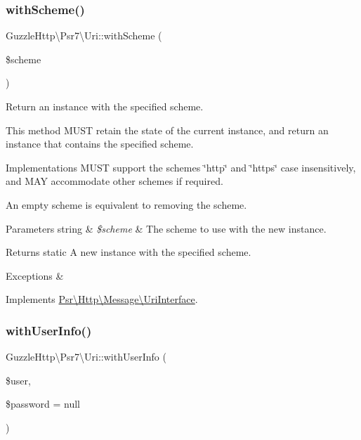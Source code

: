 \subsubsection{\texorpdfstring{with\+Scheme()}{withScheme()}}
{\footnotesize\ttfamily Guzzle\+Http\textbackslash{}\+Psr7\textbackslash{}\+Uri\+::with\+Scheme (\begin{DoxyParamCaption}\item[{}]{\$scheme }\end{DoxyParamCaption})}

Return an instance with the specified scheme.

This method M\+U\+ST retain the state of the current instance, and return an instance that contains the specified scheme.

Implementations M\+U\+ST support the schemes \char`\"{}http\char`\"{} and \char`\"{}https\char`\"{} case insensitively, and M\+AY accommodate other schemes if required.

An empty scheme is equivalent to removing the scheme.


\begin{DoxyParams}[1]{Parameters}
string & {\em \$scheme} & The scheme to use with the new instance. \\
\hline
\end{DoxyParams}
\begin{DoxyReturn}{Returns}
static A new instance with the specified scheme. 
\end{DoxyReturn}

\begin{DoxyExceptions}{Exceptions}
{\em } & \\
\hline
\end{DoxyExceptions}


Implements \hyperlink{interfacePsr_1_1Http_1_1Message_1_1UriInterface_af1eb8a046537a32fe08bc90f6debb9c6}{Psr\textbackslash{}\+Http\textbackslash{}\+Message\textbackslash{}\+Uri\+Interface}.

\mbox{\label{classGuzzleHttp_1_1Psr7_1_1Uri_aeb03c98c387f104b68a93dac0ab047e8}} 
\subsubsection{\texorpdfstring{with\+User\+Info()}{withUserInfo()}}
{\footnotesize\ttfamily Guzzle\+Http\textbackslash{}\+Psr7\textbackslash{}\+Uri\+::with\+User\+Info (\begin{DoxyParamCaption}\item[{}]{\$user,  }\item[{}]{\$password = {\ttfamily null} }\end{DoxyParamCaption})}

